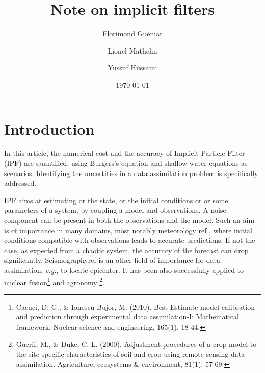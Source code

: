 \documentclass[aip,pof,nofootinbib,reprint,onecolumn]{revtex4-1}
\newcommand{\todo}[1]{{\color{red} #1 }}
\begin{document}
%

\title{Note on implicit filters}


\author{Florimond Gu\'eniat}
\author{Lionel Mathelin}
\author{Yussuf Hussaini}



\date{\today}




\begin{abstract}


\end{abstract}


\maketitle



%
\section{Introduction}
\label{sec-intro}

In this article, the numerical cost and the accuracy of Implicit Particle Filter (IPF) are quantified, using Burgers's equation and shallow water equations as scenarios.
Identifying the uncertities in a data assimilation problem is specifically addressed.

IPF aims at estimating or the state, or the initial conditions or or some parameters of a system, by coupling a model and observations. 
A noise component can be present in both the observations and the model. 
Such an aim is of importance in many domains, most notably meteorology\todo{ref}, where initial conditions compatible with observations leads to accurate predictions. 
If not the case, as expected from a chaotic system, the accuracy of the forecast can drop significantly.
Seismography{ref} is an other field of importance for data assimilation, \emph{e.g.}, to locate epicenter.
It has been also successfully applied to nuclear fusion\footnote{Cacuci, D. G., \& Ionescu-Bujor, M. (2010). Best-Estimate model calibration and prediction through experimental data assimilation-I: Mathematical framework. Nuclear science and engineering, 165(1), 18-44.} and agronomy \footnote{Guerif, M., \& Duke, C. L. (2000). Adjustment procedures of a crop model to the site specific characteristics of soil and crop using remote sensing data assimilation. Agriculture, ecosystems \& environment, 81(1), 57-69.}.
\end{document}
